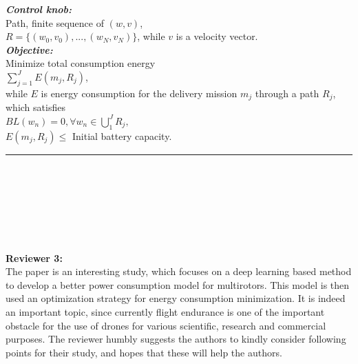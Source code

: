 \documentclass[onecolumn]{IEEEconf}
\begin{document}
\begin{description}
\begin{mdframed}[ linewidth=.75pt, userdefinedwidth=0.9\textwidth]
{{    \noindent\textit{\textbf{Control knob:}}~\\
    \indent Path, finite sequence of $(w,v)$,~\\
    \indent $R = \{(w_0,v_0), ..., (w_N,v_N)\}$, while $v$ is a velocity vector.
    ~\\
    \noindent\textit{\textbf{Objective:}}~\\ 
    \indent Minimize total consumption energy~\\
    \indent\indent $\sum_{j=1}^J E(m_j,R_j)$,~\\
    \indent while $E$ is energy consumption for the delivery mission $m_j$ through a path $R_j$, which satisfies~\\
    \indent\indent $BL(w_n) = 0, \forall w_n \in \bigcup_{1}^J R_j,$~\\
    \indent\indent $E(m_j, R_j) \leq$ Initial battery capacity.
    \vspace{5pt}
    \hrule
    \vspace{5pt}
    }
    \vspace{5pt}
    }
    ~\\
    \end{mdframed}
    ~\\~\\
\end{description}
~\\
\pagebreak
~\\
\textbf{\large Reviewer 3:}\\
The paper is an interesting study, which focuses on a deep learning based method to develop a better power consumption model for multirotors.
This model is then used an optimization strategy for energy consumption minimization. It is indeed an important topic, since currently flight endurance is one of the important obstacle for the use of drones for various scientific, research and commercial purposes. The reviewer humbly suggests the authors to kindly consider following points for their study, and hopes that these will help the authors.
\end{document}
